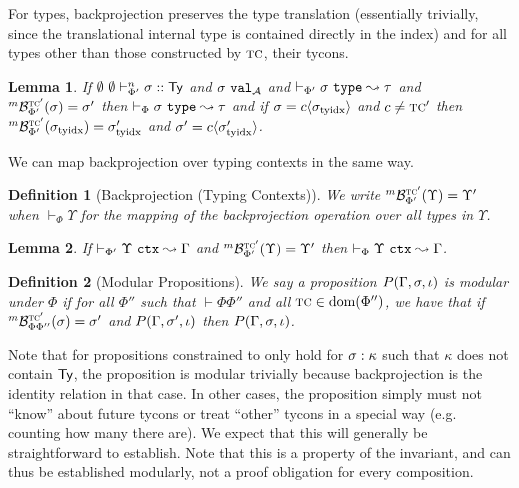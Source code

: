 \documentclass[12pt]{article}
\newtheorem{lemma}{Lemma}
\newtheorem{definition}{Definition}
\begin{document}
For types, backprojection preserves the type translation (essentially trivially, since the translational internal type is contained directly in the index) and for all types other than those constructed by $\textsc{tc}$, their tycons.

\begin{lemma}
If $\emptyset~\emptyset \vdash_{\Phi'}^{n} \sigma :: {\sf Ty}$ and $\sigma~\mathtt{val}_{\mathcal{A}}$ and $\vdash_{\Phi'} \sigma~\mathtt{type} \leadsto \tau$ and ${}^{m}\mathcal{B}_{\Phi'}^{\textsc{tc}'}(\sigma)=\sigma'$ then $\vdash_{\Phi} \sigma~\mathtt{type} \leadsto \tau$ and if $\sigma={c}\langle\sigma_\text{tyidx}\rangle$ and $c\neq\textsc{tc}'$ then ${}^{m}\mathcal{B}_{\Phi'}^{\textsc{tc}'}(\sigma_\text{tyidx})=\sigma_\text{tyidx}'$ and $\sigma'={c}\langle\sigma_\text{tyidx}'\rangle$.
\end{lemma}

We can map backprojection over typing contexts in the same way.
\begin{definition}[Backprojection (Typing Contexts)]
We write ${}^{m}\mathcal{B}_{\Phi'}^{\textsc{tc}'}(\Upsilon)=\Upsilon'$ when $\vdash_\Phi \Upsilon$ for the mapping of the backprojection operation over all types in $\Upsilon$.
\end{definition}

\begin{lemma} 
If $\vdash_{\Phi'} \Upsilon~\mathtt{ctx} \leadsto \Gamma$ and ${}^{m}\mathcal{B}_{\Phi'}^{\textsc{tc}'}(\Upsilon)=\Upsilon'$ then $\vdash_{\Phi} \Upsilon~\mathtt{ctx} \leadsto \Gamma$.
\end{lemma}

\begin{definition}[Modular Propositions]
We say a proposition $P(\Gamma, \sigma, \iota)$ is \emph{modular} under $\Phi$ if for all $\Phi''$ such that $\vdash \Phi\Phi''$ and all $\textsc{tc} \in \text{dom}(\Phi'')$, we have that if ${}^{m}\mathcal{B}_{\Phi\Phi''}^{\textsc{tc}'}(\sigma)=\sigma'$ and $P(\Gamma, \sigma', \iota)$ then $P(\Gamma, \sigma, \iota)$.
\end{definition} 

Note that for propositions constrained to only hold for $\sigma : \kappa$ such that $\kappa$ does not contain ${\sf Ty}$, the proposition is modular trivially because backprojection is the identity relation in that case. In other cases, the proposition simply must not ``know'' about future tycons or treat ``other'' tycons in a special way (e.g. counting how many there are). We expect that this will generally be straightforward to establish. Note that this is a property of the invariant, and can thus be established modularly, not a proof obligation for every composition.
\end{document}
